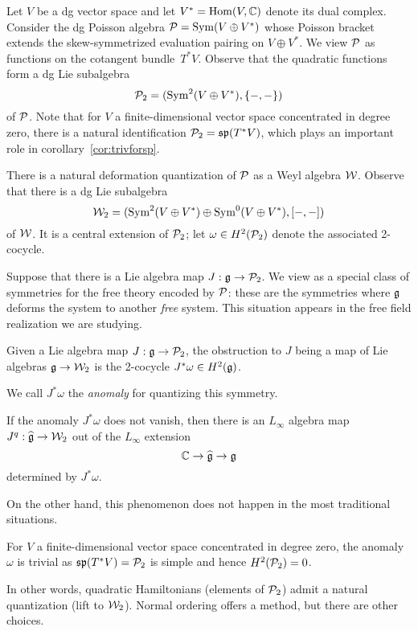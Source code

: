 \documentclass[11pt]{amsart}
\begin{document}
Let $V$ be a dg vector space and let $V^* = {\rm Hom}(V, \mathbb C)$ denote its dual complex. 
Consider the dg Poisson algebra $\mathcal P = \operatorname{Sym}(V \oplus V^*)$ whose Poisson bracket extends the skew-symmetrized evaluation pairing on $V \oplus V^*$.
We view $\mathcal P$ as functions on the cotangent bundle~$T^* V$.
Observe that the quadratic functions form a dg Lie subalgebra
\[
\mathcal P_2 = (\operatorname{Sym}^2(V \oplus V^*), \{-,-\})
\]
of $\mathcal P$.
Note that for $V$ a finite-dimensional vector space concentrated in degree zero,
there is a natural identification $\mathcal P_2 = \frak{sp}(T^*V)$, which plays an important role in corollary~\ref{cor:trivforsp}.

There is a natural deformation quantization of $\mathcal P$ as a Weyl algebra $\mathcal W$.
Observe that there is a dg Lie subalgebra
\[
\mathcal W_2 = (\operatorname{Sym}^2(V \oplus V^*) \oplus \operatorname{Sym}^0(V \oplus V^*), [-,-])
\]
of $\mathcal W$.
It is a central extension of $\mathcal P_2$; let $\omega \in H^2(\mathcal P_2)$ denote the associated 2-cocycle.

Suppose that there is a Lie algebra map $J: \mathfrak g \to \mathcal P_2$.
We view as a special class of symmetries for the free theory encoded by $\mathcal P$:
these are the symmetries where $\mathfrak g$ deforms the system to another {\em free} system.
This situation appears in the free field realization we are studying.

\begin{lem}
Given a Lie algebra map $J: \mathfrak g \to \mathcal P_2$, the obstruction to $J$ being a map of Lie algebras $\mathfrak g \to \mathcal W_2$ is the 2-cocycle $J^* \omega \in H^2(\mathfrak g)$.
\end{lem}

We call $J^*\omega$ the {\em anomaly} for quantizing this symmetry.

\begin{cor}
If the anomaly $J^*\omega$ does not vanish, then there is an $L_\infty$ algebra map $J^q: \widehat{\mathfrak g} \to \mathcal W_2$ out of the $L_\infty$ extension
\[
\mathbb C \to \widehat{\mathfrak g} \to \mathfrak g
\]
determined by $J^* \omega$.
\end{cor}

On the other hand, this phenomenon does not happen in the most traditional situations.

\begin{cor}
\label{cor:trivforsp}
For $V$ a finite-dimensional vector space concentrated in degree zero, the anomaly $\omega$ is trivial as $\frak{sp}(T^* V) = \mathcal P_2$ is simple and hence $H^2(\mathcal P_2) = 0$.
\end{cor}

In other words, quadratic Hamiltonians (elements of $\mathcal P_2$) admit a natural quantization (lift to $\mathcal W_2$).
Normal ordering offers a method, but there are other choices.
\end{document}
